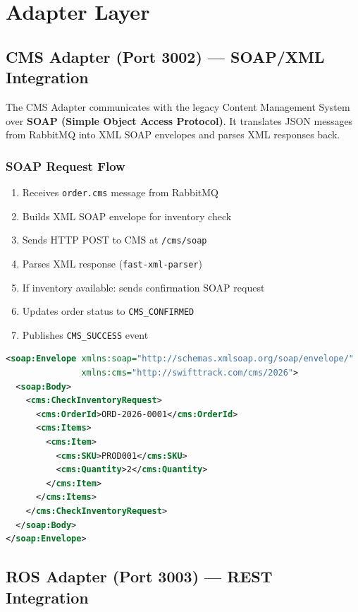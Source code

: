 \documentclass[12pt,a4paper]{article}
\begin{document}
\section{Adapter Layer}

\subsection{CMS Adapter (Port 3002) — SOAP/XML Integration}

The CMS Adapter communicates with the legacy Content Management System over \textbf{SOAP (Simple Object Access Protocol)}. It translates JSON messages from RabbitMQ into XML SOAP envelopes and parses XML responses back.

\subsubsection{SOAP Request Flow}

\begin{enumerate}
  \item Receives \texttt{order.cms} message from RabbitMQ
  \item Builds XML SOAP envelope for inventory check
  \item Sends HTTP POST to CMS at \texttt{/cms/soap}
  \item Parses XML response (\texttt{fast-xml-parser})
  \item If inventory available: sends confirmation SOAP request
  \item Updates order status to \texttt{CMS\_CONFIRMED}
  \item Publishes \texttt{CMS\_SUCCESS} event
\end{enumerate}

\begin{lstlisting}[language=XML, caption={SOAP Inventory Check Request}]
<soap:Envelope xmlns:soap="http://schemas.xmlsoap.org/soap/envelope/"
               xmlns:cms="http://swifttrack.com/cms/2026">
  <soap:Body>
    <cms:CheckInventoryRequest>
      <cms:OrderId>ORD-2026-0001</cms:OrderId>
      <cms:Items>
        <cms:Item>
          <cms:SKU>PROD001</cms:SKU>
          <cms:Quantity>2</cms:Quantity>
        </cms:Item>
      </cms:Items>
    </cms:CheckInventoryRequest>
  </soap:Body>
</soap:Envelope>
\end{lstlisting}

\subsection{ROS Adapter (Port 3003) — REST Integration}
\end{document}
